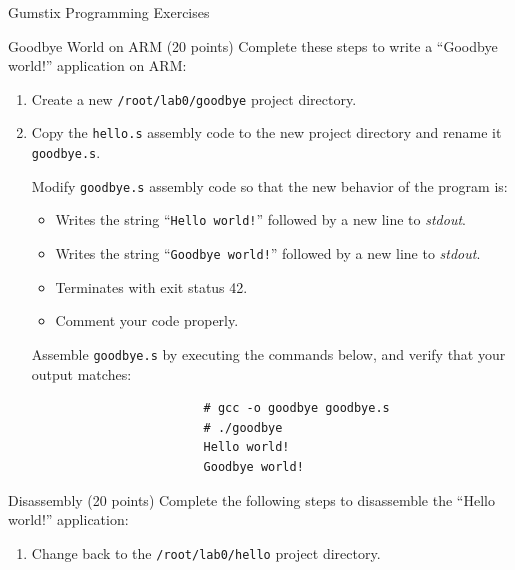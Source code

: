 \documentclass{article}
\begin{document}
\begin{section}{Gumstix Programming Exercises}
		\begin{subsection}{Goodbye World on ARM (20 points)} \label{goodbyeworld}
			Complete these steps to write a ``Goodbye world!'' application on ARM:
			\begin{enumerate}
				\begin{item}
					Generate the assembly code for the \texttt{hello.c} program:
					\begin{verbatim}
						# gcc -S -Wall -Werror hello.c
						(creates hello.s)
					\end{verbatim}
				\end{item}

				\item Create a new \texttt{/root/lab0/goodbye} project directory.

				\item Copy the \texttt{hello.s} assembly code to the new project directory
				      and rename it \texttt{goodbye.s}.

				\begin{item}
					Modify \texttt{goodbye.s} assembly code so that the new behavior of the
					program is:
					\begin{itemize}
						\item Writes the string ``\texttt{Hello world!}'' followed by a new line to
						      \emph{stdout}.
						\item Writes the string ``\texttt{Goodbye world!}'' followed by a new line
						      to \emph{stdout}.
						\item Terminates with exit status 42.
						\item Comment your code properly.
					\end{itemize}
				\end{item}

				\begin{item}
					Assemble \texttt{goodbye.s} by executing the commands below, and verify
					that your output matches:
					\begin{verbatim}
						# gcc -o goodbye goodbye.s
						# ./goodbye
						Hello world!
						Goodbye world!
					\end{verbatim}
				\end{item}
			\end{enumerate}
		\end{subsection}

		\begin{subsection}{Disassembly (20 points)}\label{disassembly}
			Complete the following steps to disassemble the ``Hello world!'' application:
			\begin{enumerate}
				\item Change back to the \texttt{/root/lab0/hello} project directory.


\end{enumerate}
\end{subsection}
\end{section}
\end{document}
